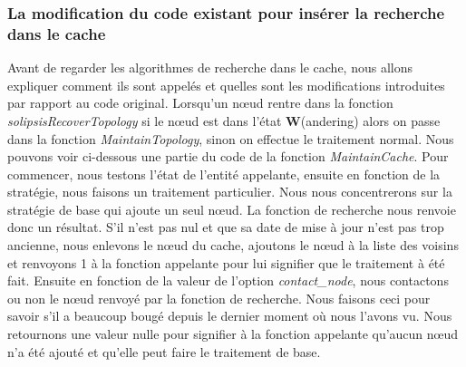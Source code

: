 \subsubsection{La modification du code existant pour insérer la recherche dans le cache}

 Avant de regarder les algorithmes de recherche dans le cache, nous allons expliquer comment ils sont appelés et quelles sont les modifications introduites par rapport au code original. Lorsqu'un nœud rentre dans la fonction \textit{solipsisRecoverTopology} si le nœud est dans l'état \textbf{W}(andering) alors on passe dans la fonction \textit{MaintainTopology}, sinon on effectue le traitement normal. Nous pouvons voir ci-dessous une partie du code de la fonction \textit{MaintainCache}. Pour commencer, nous testons l'état de l'entité appelante, ensuite en fonction de la stratégie, nous faisons un traitement particulier. Nous nous concentrerons sur la stratégie de base qui ajoute un seul nœud. La fonction de recherche nous renvoie donc un résultat. S'il n'est pas nul et que sa date de mise à jour n'est pas trop ancienne, nous enlevons le nœud du cache, ajoutons le nœud à la liste des voisins et renvoyons 1 à la fonction appelante pour lui signifier que le traitement à été fait. Ensuite en fonction de la valeur de l'option \textit{contact\_node}, nous contactons ou non le nœud renvoyé par la fonction de recherche. Nous faisons ceci pour savoir s'il a beaucoup bougé depuis le dernier moment où nous l'avons vu. Nous retournons une valeur nulle pour signifier à la fonction appelante qu'aucun nœud n'a été ajouté et qu'elle peut faire le traitement de base.

\lstset{numbers=left,basicstyle=\scriptsize, numberstyle=\tiny, stepnumber=5, numbersep=5pt}





